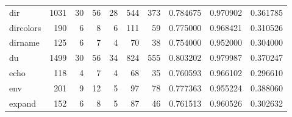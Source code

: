 \begin{tabular}{lrrrrrrrrr}
dir       &                   1031 &                                 30 &                                56 &                               28 &                               544 &                             373 &                                0.784675 &                               0.970902 &                             0.361785 \\
dircolors &                    190 &                                  6 &                                 8 &                                6 &                               111 &                              59 &                                0.775000 &                               0.968421 &                             0.310526 \\
dirname   &                    125 &                                  6 &                                 7 &                                4 &                                70 &                              38 &                                0.754000 &                               0.952000 &                             0.304000 \\
du        &                   1499 &                                 30 &                                56 &                               34 &                               824 &                             555 &                                0.803202 &                               0.979987 &                             0.370247 \\
echo      &                    118 &                                  4 &                                 7 &                                4 &                                68 &                              35 &                                0.760593 &                               0.966102 &                             0.296610 \\
env       &                    201 &                                  9 &                                12 &                                5 &                                97 &                              78 &                                0.777363 &                               0.955224 &                             0.388060 \\
expand    &                    152 &                                  6 &                                 8 &                                5 &                                87 &                              46 &                                0.761513 &                               0.960526 &                             0.302632 \\

\end{tabular}
